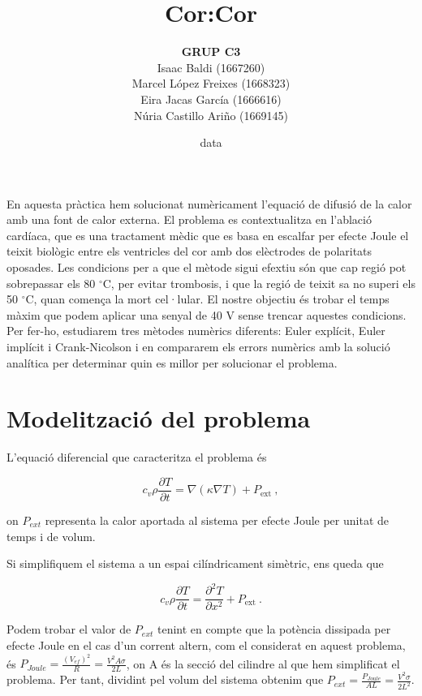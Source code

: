 \documentclass[11pt]{article}
\title{\Huge\bfseries Cor:Cor \\[1ex] \Large}
\author{\begin{tabular}{c}
\textbf{GRUP C3} \\
Isaac Baldi (1667260)\\
Marcel López Freixes (1668323) \\
Eira Jacas García (1666616) \\
Núria Castillo Ariño (1669145)
\end{tabular}}
\date{data}
\begin{document}
\maketitle

En aquesta pràctica hem solucionat numèricament l'equació de difusió de la calor amb una font de calor externa. El problema es contextualitza en l'ablació cardíaca, que es una tractament mèdic que es basa en escalfar per efecte Joule el teixit biològic entre els ventricles del cor amb dos elèctrodes de polaritats oposades. Les condicions per a que el mètode sigui efextiu són que cap regió pot sobrepassar els 80 $^\circ$C, per evitar trombosis, i que la regió de teixit sa no superi els 50 $^\circ$C, quan comença la mort cel·lular. El nostre objectiu és trobar el temps màxim que podem aplicar una senyal de 40 V sense trencar aquestes condicions. Per fer-ho, estudiarem tres mètodes numèrics diferents: Euler explícit, Euler implícit i Crank-Nicolson i en compararem els errors numèrics amb la solució analítica per determinar quin es millor per solucionar el problema.

\section{Modelització del problema} 

L'equació diferencial que caracteritza el problema és

\begin{equation}
    c_v \rho \frac{\partial T}{\partial t} = \nabla(\kappa \nabla T) + P_{\text{ext}} \ ,
\label{eq: eq_inicial}
\end{equation}

on $P_{ext}$ representa la calor aportada al sistema per efecte Joule per unitat de temps i de volum. 

Si simplifiquem el sistema a un espai cilíndricament simètric, ens queda que

\begin{equation}
    c_v \rho \frac{\partial T}{\partial t} = \frac{\partial^2 T}{\partial x^2} + P_{\text{ext}} \ .
\label{eq: eq_inicial_cilindriques}
\end{equation}

Podem trobar el valor de $P_{ext}$ tenint en compte que la potència dissipada per efecte Joule en el cas d'un corrent altern, com el considerat en aquest problema, és $P_{Joule}=\frac{(V_{ef})^2}{R}=\frac{V^2 A \sigma}{2L}$, on A és la secció del cilindre al que hem simplificat el problema. Per tant, dividint pel volum del sistema obtenim que $P_{ext}=\frac{P_{Joule}}{AL}=\frac{V^2 \sigma}{2L^2}$.
\end{document}
